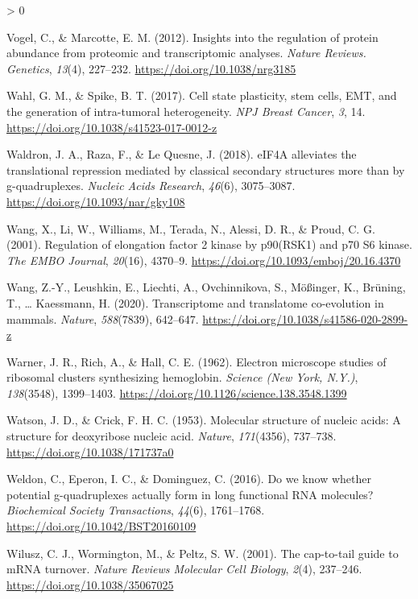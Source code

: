 \documentclass[
  12pt,
  openany]{book}
\newlength{\cslhangindent}
\newenvironment{CSLReferences}[2] %
 {%
  \setlength{\parindent}{0pt}
  \ifodd #1 \everypar{\setlength{\hangindent}{\cslhangindent}}\ignorespaces\fi
  \ifnum #2 > 0
  \setlength{\parskip}{#2\baselineskip}
  \fi
 }%
 {}
\begin{document}
\begin{CSLReferences}{1}{0}
\leavevmode\hypertarget{ref-Vogel2012}{}%
Vogel, C., \& Marcotte, E. M. (2012). Insights into the regulation of protein abundance from proteomic and transcriptomic analyses. \emph{Nature Reviews. Genetics}, \emph{13}(4), 227--232. \url{https://doi.org/10.1038/nrg3185}

\leavevmode\hypertarget{ref-Wahl2017}{}%
Wahl, G. M., \& Spike, B. T. (2017). Cell state plasticity, stem cells, {EMT}, and the generation of intra-tumoral heterogeneity. \emph{{NPJ} Breast Cancer}, \emph{3}, 14. \url{https://doi.org/10.1038/s41523-017-0012-z}

\leavevmode\hypertarget{ref-Waldron2018}{}%
Waldron, J. A., Raza, F., \& Le Quesne, J. (2018). {eIF}4A alleviates the translational repression mediated by classical secondary structures more than by g-quadruplexes. \emph{Nucleic Acids Research}, \emph{46}(6), 3075--3087. \url{https://doi.org/10.1093/nar/gky108}

\leavevmode\hypertarget{ref-Wang2001}{}%
Wang, X., Li, W., Williams, M., Terada, N., Alessi, D. R., \& Proud, C. G. (2001). Regulation of elongation factor 2 kinase by p90({RSK}1) and p70 S6 kinase. \emph{The {EMBO} Journal}, \emph{20}(16), 4370--9. \url{https://doi.org/10.1093/emboj/20.16.4370}

\leavevmode\hypertarget{ref-Wang2020}{}%
Wang, Z.-Y., Leushkin, E., Liechti, A., Ovchinnikova, S., Mößinger, K., Brüning, T., \ldots{} Kaessmann, H. (2020). Transcriptome and translatome co-evolution in mammals. \emph{Nature}, \emph{588}(7839), 642--647. \url{https://doi.org/10.1038/s41586-020-2899-z}

\leavevmode\hypertarget{ref-Warner1962}{}%
Warner, J. R., Rich, A., \& Hall, C. E. (1962). Electron microscope studies of ribosomal clusters synthesizing hemoglobin. \emph{Science (New York, N.Y.)}, \emph{138}(3548), 1399--1403. \url{https://doi.org/10.1126/science.138.3548.1399}

\leavevmode\hypertarget{ref-Watson1953}{}%
Watson, J. D., \& Crick, F. H. C. (1953). Molecular structure of nucleic acids: A structure for deoxyribose nucleic acid. \emph{Nature}, \emph{171}(4356), 737--738. \url{https://doi.org/10.1038/171737a0}

\leavevmode\hypertarget{ref-Weldon2016}{}%
Weldon, C., Eperon, I. C., \& Dominguez, C. (2016). Do we know whether potential g-quadruplexes actually form in long functional {RNA} molecules? \emph{Biochemical Society Transactions}, \emph{44}(6), 1761--1768. \url{https://doi.org/10.1042/BST20160109}

\leavevmode\hypertarget{ref-Wilusz2001}{}%
Wilusz, C. J., Wormington, M., \& Peltz, S. W. (2001). The cap-to-tail guide to {mRNA} turnover. \emph{Nature Reviews Molecular Cell Biology}, \emph{2}(4), 237--246. \url{https://doi.org/10.1038/35067025}


\end{CSLReferences}
\end{document}
